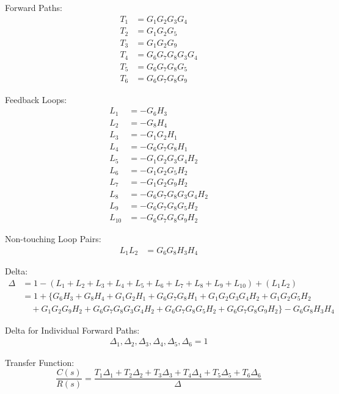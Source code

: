 \documentclass[11pt]{article}
\begin{document}
Forward Paths:
\begin{align*}
T_1 &= G_1 G_2 G_3 G_4 \\
T_2 &= G_1 G_2 G_5 \\
T_3 &= G_1 G_2 G_9 \\
T_4 &= G_6 G_7 G_8 G_3 G_4 \\
T_5 &= G_6 G_7 G_8 G_5 \\
T_6 &= G_6 G_7 G_8 G_9
\end{align*}

Feedback Loops:
\begin{align*}
L_1 &= -G_6 H_3 \\
L_2 &= -G_8 H_4 \\
L_3 &= -G_1 G_2 H_1 \\
L_4 &= -G_6 G_7 G_8 H_1 \\
L_5 &= -G_1 G_2 G_3 G_4 H_2 \\
L_6 &= -G_1 G_2 G_5 H_2 \\
L_7 &= -G_1 G_2 G_9 H_2 \\
L_8 &= -G_6 G_7 G_8 G_3 G_4 H_2 \\
L_9 &= -G_6 G_7 G_8 G_5 H_2 \\
L_{10} &= -G_6 G_7 G_8 G_9 H_2
\end{align*}

Non-touching Loop Pairs:
\begin{align*}
L_1L_2 &= G_6 G_8 H_3 H_4
\end{align*}

Delta:
{\small
\begin{align*}
\Delta &= 1 - (L_1 + L_2 + L_3 + L_4 + L_5 + L_6 + L_7 + L_8 + L_9 + L_{10}) + (L_1 L_2) \\
       &= 1 + \{ G_6 H_3 + G_8 H_4 + G_1 G_2 H_1 + G_6 G_7 G_8 H_1 + G_1 G_2 G_3 G_4 H_2 + G_1 G_2 G_5 H_2 \\
       &\quad + G_1 G_2 G_9 H_2 + G_6 G_7 G_8 G_3 G_4 H_2 + G_6 G_7 G_8 G_5 H_2 + G_6 G_7 G_8 G_9 H_2 \} - G_6 G_8 H_3 H_4
\end{align*}
}

Delta for Individual Forward Paths:
\begin{align*}
\Delta_1, \Delta_2, \Delta_3, \Delta_4, \Delta_5, \Delta_6 = 1
\end{align*}

Transfer Function:
\[
\frac{C(s)}{R(s)} = \frac{T_1 \Delta_1 + T_2 \Delta_2 + T_3 \Delta_3 + T_4 \Delta_4 + T_5 \Delta_5 + T_6 \Delta_6}{\Delta}
\]

\noindent{}
\end{document}
